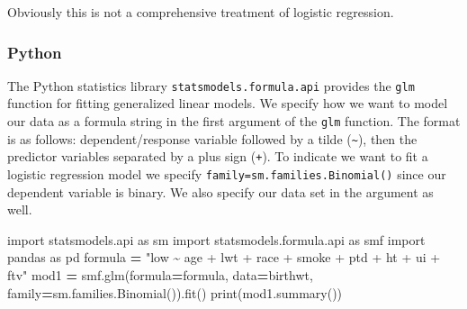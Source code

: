 \documentclass[
]{book}
\newenvironment{Shaded}{\begin{snugshade}}{\end{snugshade}}
\newcommand{\BuiltInTok}[1]{#1}
\newcommand{\ImportTok}[1]{#1}
\newcommand{\NormalTok}[1]{#1}
\newcommand{\OperatorTok}[1]{\textcolor[rgb]{0.81,0.36,0.00}{\textbf{#1}}}
\newcommand{\StringTok}[1]{\textcolor[rgb]{0.31,0.60,0.02}{#1}}
\begin{document}
Obviously this is not a comprehensive treatment of logistic regression.

\hypertarget{python-50}{%
\subsubsection*{Python}\label{python-50}}

The Python statistics library \texttt{statsmodels.formula.api} provides the \texttt{glm} function for fitting generalized linear models. We specify how we want to model our data as a formula string in the first argument of the \texttt{glm} function. The format is as follows: dependent/response variable followed by a tilde (\texttt{\textasciitilde{}}), then the predictor variables separated by a plus sign (\texttt{+}). To indicate we want to fit a logistic regression model we specify \texttt{family=sm.families.Binomial()} since our dependent variable is binary. We also specify our data set in the argument as well.

\begin{Shaded}
\begin{Highlighting}[]
\ImportTok{import}\NormalTok{ statsmodels.api }\ImportTok{as}\NormalTok{ sm}
\ImportTok{import}\NormalTok{ statsmodels.formula.api }\ImportTok{as}\NormalTok{ smf}
\ImportTok{import}\NormalTok{ pandas }\ImportTok{as}\NormalTok{ pd}
\NormalTok{formula }\OperatorTok{=} \StringTok{"low \textasciitilde{} age + lwt + race + smoke + ptd + ht + ui + ftv"}
\NormalTok{mod1 }\OperatorTok{=}\NormalTok{ smf.glm(formula}\OperatorTok{=}\NormalTok{formula, data}\OperatorTok{=}\NormalTok{birthwt,}
\NormalTok{               family}\OperatorTok{=}\NormalTok{sm.families.Binomial()).fit()}
\BuiltInTok{print}\NormalTok{(mod1.summary())}
\end{Highlighting}
\end{Shaded}
\end{document}
